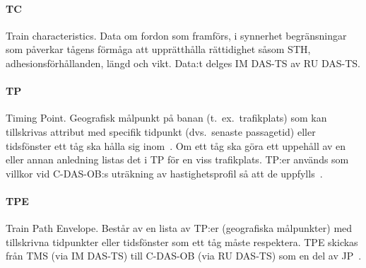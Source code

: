 \paragraph{TC}
Train characteristics.
Data om fordon som framförs, i synnerhet begränsningar som påverkar tågens förmåga att upprätthålla rättidighet såsom STH, adhesionsförhållanden, längd och vikt.
Data:t delges IM DAS-TS av RU DAS-TS\@.
\paragraph{TP}
Timing Point.
Geografisk målpunkt på banan (t.~ex.~trafikplats) som kan tillskrivas attribut med specifik tidpunkt (dvs.~senaste passagetid) eller tidsfönster ett tåg ska hålla sig inom~\cite{Olsson2023}.
Om ett tåg ska göra ett uppehåll av en eller annan anledning listas det i TP för en viss trafikplats.
TP:er används som villkor vid C-DAS-OB:s uträkning av hastighetsprofil så att de uppfylls~\cite{Olsson2023}.
\paragraph{TPE}
Train Path Envelope.
Består av en lista av TP:er (geografiska målpunkter) med tillskrivna tidpunkter eller tidsfönster som ett tåg måste respektera.
TPE skickas från TMS (via IM DAS-TS) till C-DAS-OB (via RU DAS-TS) som en del av JP~\cite{Olsson2023}.

